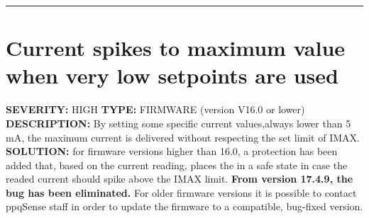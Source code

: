 
\rule{\textwidth}{0.4pt}


\section{Current spikes to maximum value when very low setpoints are used}

\newline \newline
\textbf{SEVERITY:} HIGH
\newline \newline
\textbf{TYPE:} FIRMWARE (version V16.0 or lower)
\newline \newline
\textbf{DESCRIPTION:} By setting some specific current values,always lower than 5 mA, the maximum current is delivered without respecting the set limit of IMAX.
\newline \newline
\textbf{SOLUTION:} for firmware versions higher than 16.0, a protection has been added that, based on the current reading, places the \QubeModel in a safe state in case the readed current should spike above the IMAX limit.
\newline \textbf{From version 17.4.9, the bug has been eliminated.}
\newline For older firmware versions it is possible to contact ppqSense staff in order to update the firmware to a compatible, bug-fixed version.